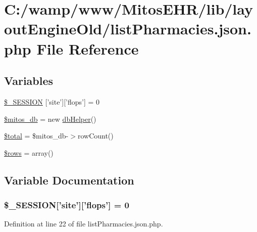 \hypertarget{list_pharmacies_8json_8php}{\section{\-C\-:/wamp/www/\-Mitos\-E\-H\-R/lib/layout\-Engine\-Old/list\-Pharmacies.json.\-php \-File \-Reference}
\label{list_pharmacies_8json_8php}
}
\subsection*{\-Variables}
\begin{DoxyCompactItemize}
\item 
\hyperlink{list_pharmacies_8json_8php_a99fda8552a3e58235643b79f5af3ded8}{\$\-\_\-\-S\-E\-S\-S\-I\-O\-N} \mbox{[}'site'\mbox{]}\mbox{[}'flops'\mbox{]} = 0
\item 
\hyperlink{list_pharmacies_8json_8php_ab5d961f93efe4e2e8d8374f01dd6c65a}{\$mitos\-\_\-db} = new \hyperlink{classdb_helper}{db\-Helper}()
\item 
\hyperlink{list_pharmacies_8json_8php_a241b818f48030b628685b2e5119c5624}{\$total} = \$mitos\-\_\-db-\/$>$row\-Count()
\item 
\hyperlink{list_pharmacies_8json_8php_ace2ec39e7df3899fa8df9640ec274b03}{\$rows} = array()
\end{DoxyCompactItemize}


\subsection{\-Variable \-Documentation}
\hypertarget{list_pharmacies_8json_8php_a99fda8552a3e58235643b79f5af3ded8}{
\subsubsection[{\$\-\_\-\-S\-E\-S\-S\-I\-O\-N}]{\setlength{\rightskip}{0pt plus 5cm}\$\-\_\-\-S\-E\-S\-S\-I\-O\-N\mbox{[}'site'\mbox{]}\mbox{[}'flops'\mbox{]} = 0}}\label{list_pharmacies_8json_8php_a99fda8552a3e58235643b79f5af3ded8}


\-Definition at line 22 of file list\-Pharmacies.\-json.\-php.

